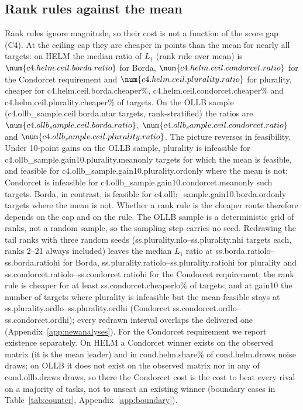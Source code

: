 \subsection{Rank rules against the mean}\label{sec:ordinal}
Rank rules ignore magnitude, so their cost is not a function of the score gap (C4). At the ceiling cap they are cheaper in points than the mean for nearly all targets: on HELM the median ratio of $L_1$ (rank rule over mean) is $\num{c4.helm.ceil.borda.ratio}$ for Borda, $\num{c4.helm.ceil.condorcet.ratio}$ for the Condorcet requirement and $\num{c4.helm.ceil.plurality.ratio}$ for plurality, cheaper for \num{c4.helm.ceil.borda.cheaper}\%, \num{c4.helm.ceil.condorcet.cheaper}\% and \num{c4.helm.ceil.plurality.cheaper}\% of targets. On the OLLB sample (\num{c4.ollb_sample.ceil.borda.ntar} targets, rank-stratified) the ratios are $\num{c4.ollb_sample.ceil.borda.ratio}$, $\num{c4.ollb_sample.ceil.condorcet.ratio}$ and $\num{c4.ollb_sample.ceil.plurality.ratio}$.
The picture reverses in feasibility. Under 10-point gains on the OLLB sample, plurality is infeasible for \num{c4.ollb_sample.gain10.plurality.meanonly} targets for which the mean is feasible, and feasible for \num{c4.ollb_sample.gain10.plurality.ordonly} where the mean is not; Condorcet is infeasible for \num{c4.ollb_sample.gain10.condorcet.meanonly} such targets. Borda, in contrast, is feasible for \num{c4.ollb_sample.gain10.borda.ordonly} targets where the mean is not. Whether a rank rule is the cheaper route therefore depends on the cap and on the rule.
The OLLB sample is a deterministic grid of ranks, not a random sample, so the sampling step carries no seed. Redrawing the tail ranks with three random seeds (\num{ss.plurality.nlo}--\num{ss.plurality.nhi} targets each, ranks 2--21 always included) leaves the median $L_1$ ratio at \num{ss.borda.ratiolo}--\num{ss.borda.ratiohi} for Borda, \num{ss.plurality.ratiolo}--\num{ss.plurality.ratiohi} for plurality and \num{ss.condorcet.ratiolo}--\num{ss.condorcet.ratiohi} for the Condorcet requirement; the rank rule is cheaper for at least \num{ss.condorcet.cheaperlo}\% of targets; and at \textsf{gain10} the number of targets where plurality is infeasible but the mean feasible stays at \num{ss.plurality.ordlo}--\num{ss.plurality.ordhi} (Condorcet \num{ss.condorcet.ordlo}--\num{ss.condorcet.ordhi}); every redrawn interval overlaps the delivered one (Appendix~\ref{app:newanalyses}).
For the Condorcet requirement we report existence separately. On HELM a Condorcet winner exists on the observed matrix (it is the mean leader) and in \num{cond.helm.share}\% of \num{cond.helm.draws} noise draws; on OLLB it does not exist on the observed matrix nor in any of \num{cond.ollb.draws} draws, so there the Condorcet cost is the cost to beat every rival on a majority of tasks, not to unseat an existing winner (boundary cases in Table~\ref{tab:counter}, Appendix~\ref{app:boundary}).

